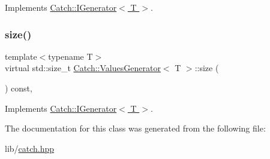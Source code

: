 Implements \hyperlink{struct_catch_1_1_i_generator_ad69e937cb66dba3ed9429c42abf4fce3}{Catch\+::\+I\+Generator$<$ T $>$}.

\hypertarget{class_catch_1_1_values_generator_a9aa5b140ee502975cf35115e534ab771}{}\label{class_catch_1_1_values_generator_a9aa5b140ee502975cf35115e534ab771} 
\subsubsection{\texorpdfstring{size()}{size()}}
{\footnotesize\ttfamily template$<$typename T$>$ \\
virtual std\+::size\+\_\+t \hyperlink{class_catch_1_1_values_generator}{Catch\+::\+Values\+Generator}$<$ T $>$\+::size (\begin{DoxyParamCaption}{ }\end{DoxyParamCaption}) const\hspace{0.3cm}{\ttfamily [inline]}, {\ttfamily [virtual]}}



Implements \hyperlink{struct_catch_1_1_i_generator_a2e317253b03e838b6065ce69719a198e}{Catch\+::\+I\+Generator$<$ T $>$}.



The documentation for this class was generated from the following file\+:\begin{DoxyCompactItemize}
\item 
lib/\hyperlink{catch_8hpp}{catch.\+hpp}\end{DoxyCompactItemize}

